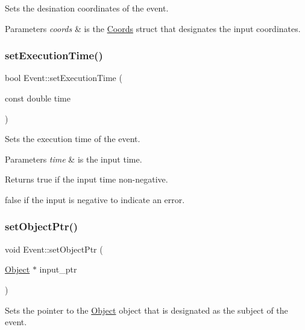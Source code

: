 Sets the desination coordinates of the event. 


\begin{DoxyParams}{Parameters}
{\em coords} & is the \hyperlink{struct_coords}{Coords} struct that designates the input coordinates. \\
\hline
\end{DoxyParams}
\mbox{\label{class_event_af4282af20bd5b3940ba75c23e6032f18}} 
\subsubsection{\texorpdfstring{set\+Execution\+Time()}{setExecutionTime()}}
{\footnotesize\ttfamily bool Event\+::set\+Execution\+Time (\begin{DoxyParamCaption}\item[{const double}]{time }\end{DoxyParamCaption})}



Sets the execution time of the event. 


\begin{DoxyParams}{Parameters}
{\em time} & is the input time. \\
\hline
\end{DoxyParams}
\begin{DoxyReturn}{Returns}
true if the input time non-\/negative. 

false if the input is negative to indicate an error. 
\end{DoxyReturn}
\mbox{\label{class_event_a078cadde679fc042486ef065a097c7af}} 
\subsubsection{\texorpdfstring{set\+Object\+Ptr()}{setObjectPtr()}}
{\footnotesize\ttfamily void Event\+::set\+Object\+Ptr (\begin{DoxyParamCaption}\item[{\hyperlink{class_object}{Object} $\ast$}]{input\+\_\+ptr }\end{DoxyParamCaption})}



Sets the pointer to the \hyperlink{class_object}{Object} object that is designated as the subject of the event. 



